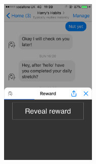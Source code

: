 \begin{figure}[H]
  \centering
  \includegraphics[width=1.8in]{resources/design/reward-visual-1.png}
\end{figure}
